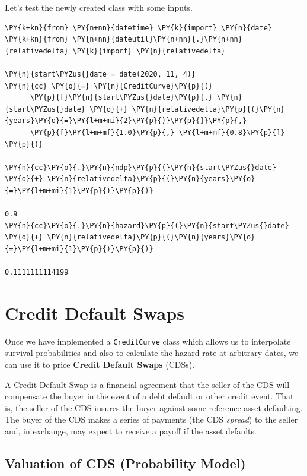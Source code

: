 Let's test the newly created class with some inputs.
\begin{tcolorbox}[breakable, size=fbox, boxrule=1pt, pad at break*=1mm,colback=cellbackground, colframe=cellborder]
\begin{Verbatim}[commandchars=\\\{\}]
\PY{k+kn}{from} \PY{n+nn}{datetime} \PY{k}{import} \PY{n}{date}
\PY{k+kn}{from} \PY{n+nn}{dateutil}\PY{n+nn}{.}\PY{n+nn}{relativedelta} \PY{k}{import} \PY{n}{relativedelta}

\PY{n}{start\PYZus{}date = date(2020, 11, 4)}        
\PY{n}{cc} \PY{o}{=} \PY{n}{CreditCurve}\PY{p}{(}
      \PY{p}{[}\PY{n}{start\PYZus{}date}\PY{p}{,} \PY{n}{start\PYZus{}date} \PY{o}{+} \PY{n}{relativedelta}\PY{p}{(}\PY{n}{years}\PY{o}{=}\PY{l+m+mi}{2}\PY{p}{)}\PY{p}{]}\PY{p}{,}
      \PY{p}{[}\PY{l+m+mf}{1.0}\PY{p}{,} \PY{l+m+mf}{0.8}\PY{p}{]}
\PY{p}{)}

\PY{n}{cc}\PY{o}{.}\PY{n}{ndp}\PY{p}{(}\PY{n}{start\PYZus{}date} \PY{o}{+} \PY{n}{relativedelta}\PY{p}{(}\PY{n}{years}\PY{o}{=}\PY{l+m+mi}{1}\PY{p}{)}\PY{p}{)}

0.9
\PY{n}{cc}\PY{o}{.}\PY{n}{hazard}\PY{p}{(}\PY{n}{start\PYZus{}date} \PY{o}{+} \PY{n}{relativedelta}\PY{p}{(}\PY{n}{years}\PY{o}{=}\PY{l+m+mi}{1}\PY{p}{)}\PY{p}{)}

0.1111111114199
\end{Verbatim}
\end{tcolorbox}    
            
\section{Credit Default Swaps}\label{credit-deafult-swaps}

Once we have implemented a \texttt{CreditCurve} class which allows us to
interpolate survival probabilities and also to calculate the hazard rate at arbitrary
dates, we can use it to price \textbf{Credit Default Swaps} (CDSs).

A Credit Default Swap is a financial agreement that the seller of the CDS will compensate the buyer in the event of a debt default or other credit event. 
That is, the seller of the CDS insures the buyer against some reference asset defaulting. The buyer of the CDS makes a series of payments (the CDS \emph{spread}) to the seller and, in exchange, may expect to receive a payoff if the asset defaults.

\subsection{Valuation of CDS (Probability Model)}

